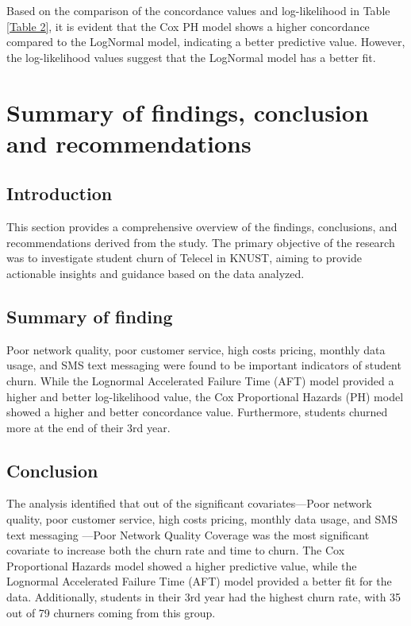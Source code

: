\documentclass[doublespacing,12pt]{report}
\begin{document}
{\begin{table}[H]
		\end{table}

\normalsize{\noindent Based on the comparison of the concordance values and log-likelihood in Table \ref{Table 2}, it is evident that the Cox PH model shows a higher concordance compared to the LogNormal model, indicating a better predictive value. However, the log-likelihood values suggest that the LogNormal model has a better fit. }

\newpage
\chapter{Summary of findings, conclusion and recommendations}

\section{Introduction}
\normalsize{ This section provides a comprehensive overview of the findings, conclusions, and recommendations derived from the study. The primary objective of the research was to investigate student churn of Telecel in KNUST, aiming to provide actionable insights and guidance based on the data analyzed.}

\section{Summary of finding}
Poor network quality, poor customer service, high costs pricing, monthly data usage, and SMS text messaging were found to be important indicators of student churn. While the Lognormal Accelerated Failure Time (AFT) model provided a higher and better log-likelihood value, the Cox Proportional Hazards (PH) model showed a higher and better concordance value. Furthermore, students churned more at the end of their 3rd year.

\section{Conclusion}
\normalsize{The analysis identified that out of the significant covariates—Poor network quality, poor customer service, high costs pricing, monthly data usage, and SMS text messaging —Poor Network Quality Coverage was the most significant covariate to increase both the churn rate and time to churn. The Cox Proportional Hazards model showed a higher predictive value, while the Lognormal Accelerated Failure Time (AFT) model provided a better fit for the data. Additionally, students in their 3rd year had the highest churn rate, with 35 out of 79 churners coming from this group.}

}
\end{document}

